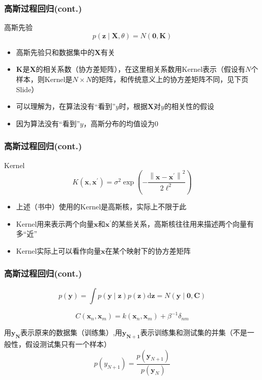 \documentclass[aspectratio=169]{beamer}
\begin{document}
\begin{frame}
  \frametitle{高斯过程回归(cont.)}
  高斯先验
  $$
  p(\mathbf{z} \mid \mathbf{X}, \theta)=N(\mathbf{0}, \mathbf{K})
  $$
  \begin{itemize}
    \item 高斯先验只和数据集中的$\mathbf{X}$有关
    \item $\mathbf{K}$是$\mathbf{X}$的相关系数（协方差矩阵），在这里相关系数用Kernel表示（假设有$N$个样本，则Kernel是$N \times N$的矩阵，和传统意义上的协方差矩阵不同，见下页Slide）
    \item 可以理解为，在算法没有“看到”$y$时，根据$\mathbf{X}$对$y$的相关性的假设
    \item 因为算法没有“看到”$y$，高斯分布的均值设为0
  \end{itemize}
\end{frame}

\begin{frame}
  \frametitle{高斯过程回归(cont.)}
  Kernel
  $$
  K(\mathbf{x},\mathbf{x}^{\prime} )=\sigma^{2} \exp \left(-\frac{\left\|\mathbf{x}-\mathbf{x}^{\prime}\right\|^{2}}{2 \ell^{2}}\right)
  $$
  \begin{itemize}
    \item 上述（书中）使用的Kernel是高斯核，实际上不限于此
    \item Kernel用来表示两个向量$\mathbf{x}$和$\mathbf{x}^{\prime}$的某些关系，高斯核往往用来描述两个向量有多“近”
    \item Kernel实际上可以看作向量$\mathbf{x}$在某个映射下的协方差矩阵
  \end{itemize}
\end{frame}

\begin{frame}
  \frametitle{高斯过程回归(cont.)}
  $$
  p(\mathbf{y}) = \int p(\mathbf{y}\mid \mathbf{z})p(\mathbf{z}) \mathrm{d}{\mathbf{z}} = N(\mathbf{y} \mid \mathbf{0}, \mathbf{C})
  $$

  $$
  C\left(\mathbf{x}_{n}, \mathbf{x}_{m}\right)=k\left(\mathbf{x}_{n}, \mathbf{x}_{m}\right)+\beta^{-1} \delta_{n m}
  $$

  用$\mathbf{y_N}$表示原来的数据集（训练集）,用$\mathbf{y_{N+1}}$表示训练集和测试集的并集（不是一般性，假设测试集只有一个样本）
  $$
  p(y_{N + 1}) = \frac{p(\mathbf{y}_{N+1})}{p(\mathbf{y}_N)}
  $$
\end{frame}
\end{document}
